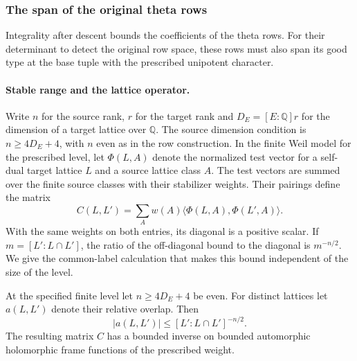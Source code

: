 \subsubsection*{The span of the original theta rows}
\label{subsec:theta-row-rank}

Integrality after descent bounds the coefficients of the theta rows. For their determinant to detect the original row space, these rows must also span its good type at the base tuple with the prescribed unipotent character.

\paragraph{Stable range and the lattice operator.}
Write \(n\) for the source rank, \(r\) for the target
rank and \(D_E=[E:\mathbb Q]r\) for the dimension of a
target lattice over \(\mathbb Q\). The source dimension
condition is \(n\ge 4D_E+4\), with \(n\) even as in the
row construction. In the finite Weil model
for the prescribed level, let \(\Phi(L,A)\) denote the
normalized test vector for a self-dual target lattice
\(L\) and a source lattice class \(A\). The test vectors
are summed over the finite source classes with their
stabilizer weights. Their pairings define the matrix
\[
      C(L,L')=\sum_A w(A)
                \langle\Phi(L,A),\Phi(L',A)\rangle .
\]
With the same weights on both entries, its diagonal
is a positive scalar. If \(m=[L':L\cap L']\), the
ratio of the off-diagonal bound to the diagonal is
\(m^{-n/2}\). We give the common-label calculation
that makes this bound independent of the size of the level.

\begin{lemma}\label{lem:theta-overlap-invertible}
At the specified finite level let \(n\ge4D_E+4\) be even.
For distinct lattices let \(a(L,L')\) denote their relative overlap. Then
\[
 |a(L,L')|\le [L':L\cap L']^{-n/2}.
\] The resulting matrix \(C\) has
a bounded inverse on bounded automorphic holomorphic frame functions
of the prescribed weight.
\end{lemma}

